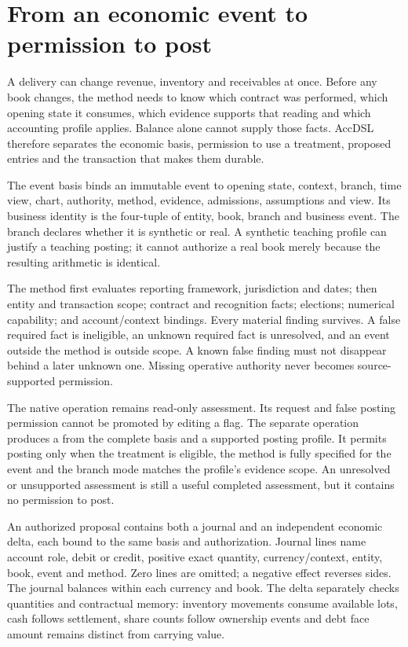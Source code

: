 \section{From an economic event to permission to post}
\label{sec:posting-permission}

A delivery can change revenue, inventory and receivables at once. Before any
book changes, the method needs to know which contract was performed, which
opening state it consumes, which evidence supports that reading and which
accounting profile applies. Balance alone cannot supply those facts. AccDSL
therefore separates the economic basis, permission to use a treatment, proposed
entries and the transaction that makes them durable.

The event basis binds an immutable event to opening state, context, branch,
time view, chart, authority, method, evidence, admissions, assumptions and view.
Its business identity is the four-tuple of entity, book, branch and business
event. The branch declares whether it is synthetic or real. A synthetic teaching
profile can justify a teaching posting; it cannot authorize a real book merely
because the resulting arithmetic is identical.

The method first evaluates reporting framework, jurisdiction and dates; then
entity and transaction scope; contract and recognition facts; elections;
numerical capability; and account/context bindings. Every material finding
survives. A false required fact is ineligible, an unknown required fact is
unresolved, and an event outside the method is outside scope. A known false
finding must not disappear behind a later unknown one. Missing operative
authority never becomes source-supported permission.

The native operation  remains read-only assessment.
Its  request and false posting permission cannot be promoted
by editing a flag. The separate  operation produces
a  from the complete basis and a supported posting
profile. It permits posting only when the treatment is eligible, the method is
fully specified for the event and the branch mode matches the profile's
evidence scope. An unresolved or unsupported assessment is still a useful
completed assessment, but it contains no permission to post.

An authorized proposal contains both a journal and an independent economic
delta, each bound to the same basis and authorization. Journal lines name
account role, debit or credit, positive exact quantity, currency/context,
entity, book, event and method. Zero lines are omitted; a negative effect reverses
sides. The journal balances within each currency and book. The delta separately
checks quantities and contractual memory: inventory movements consume available
lots, cash follows settlement, share counts follow ownership events and debt
face amount remains distinct from carrying value.

